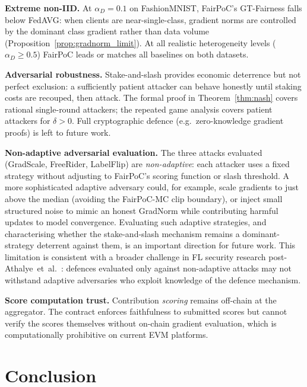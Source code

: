 \documentclass[journal]{IEEEtran}
\theoremstyle{definition}
\theoremstyle{remark}
\begin{document}
\textbf{Extreme non-IID.}
At $\alpha_D = 0.1$ on FashionMNIST, FairPoC's GT-Fairness
falls below FedAVG: when clients are near-single-class, gradient
norms are controlled by the dominant class gradient rather than
data volume (Proposition~\ref{prop:gradnorm_limit}).
At all realistic heterogeneity levels ($\alpha_D \geq 0.5$)
FairPoC leads or matches all baselines on both datasets.

\textbf{Adversarial robustness.}
Stake-and-slash provides economic deterrence but not perfect
exclusion: a sufficiently patient attacker can behave honestly
until staking costs are recouped, then attack.
The formal proof in Theorem~\ref{thm:nash} covers rational
single-round attackers; the repeated game analysis covers patient
attackers for $\delta > 0$.
Full cryptographic defence (e.g.\ zero-knowledge gradient proofs)
is left to future work.

\textbf{Non-adaptive adversarial evaluation.}
The three attacks evaluated (GradScale, FreeRider, LabelFlip) are
\emph{non-adaptive}: each attacker uses a fixed strategy without
adjusting to FairPoC's scoring function or slash threshold.
A more sophisticated adaptive adversary could, for example,
scale gradients to just above the median (avoiding the FairPoC-MC
clip boundary), or inject small structured noise to mimic an honest
GradNorm while contributing harmful updates to model convergence.
Evaluating such adaptive strategies, and characterising whether
the stake-and-slash mechanism remains a dominant-strategy deterrent
against them, is an important direction for future work.
This limitation is consistent with a broader challenge in FL security
research post-Athalye~et~al.~\cite{bhagoji2019analyzing}: defences
evaluated only against non-adaptive attacks may not withstand adaptive
adversaries who exploit knowledge of the defence mechanism.

\textbf{Score computation trust.}
Contribution \emph{scoring} remains off-chain at the aggregator.
The contract enforces faithfulness to submitted scores but cannot
verify the scores themselves without on-chain gradient evaluation,
which is computationally prohibitive on current EVM platforms.

\section{Conclusion}
\label{sec:conclusion}
\end{document}

